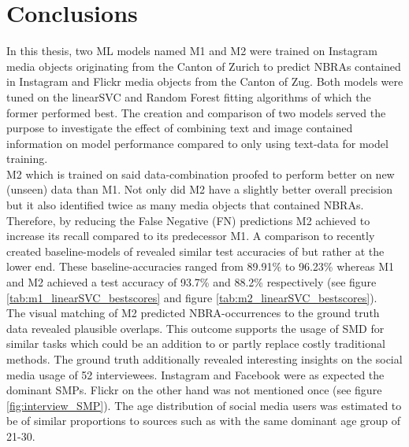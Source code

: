 \chapter{Conclusions} \label{conclusion_outlook}

In this thesis, two ML models named M1 and M2 were trained on Instagram media objects originating from the Canton of Zurich to predict NBRAs contained in Instagram and Flickr media objects from the Canton of Zug. Both models were tuned on the linearSVC and Random Forest fitting algorithms of which the former performed best. The creation and comparison of two models served the purpose to investigate the effect of combining text and image contained information on model performance compared to only using text-data for model training.\\
M2 which is trained on said data-combination proofed to perform better on new (unseen) data than M1. Not only did M2 have a slightly better overall precision but it also identified twice as many media objects that contained NBRAs. Therefore, by reducing the False Negative (FN) predictions M2 achieved to increase its recall compared to its predecessor M1. A comparison to recently created baseline-models of \parencite{Das2018, Li2018} revealed similar test accuracies of but rather at the lower end. These baseline-accuracies ranged from 89.91\% to 96.23\% whereas M1 and M2 achieved a test accuracy of 93.7\% and 88.2\% respectively (see figure \ref{tab:m1_linearSVC_bestscores} and figure \ref{tab:m2_linearSVC_bestscores}).\\
The visual matching of M2 predicted NBRA-occurrences to the ground truth data revealed plausible overlaps. This outcome supports the usage of SMD for similar tasks which could be an addition to or partly replace costly traditional methods. The ground truth additionally revealed interesting insights on the social media usage of 52 interviewees. Instagram and Facebook were as expected the dominant SMPs. Flickr on the other hand was not mentioned once (see figure \ref{fig:interview_SMP}). The age distribution of social media users was estimated to be of similar proportions  to sources such as \parencite{2013} with the same dominant age group of 21-30.

